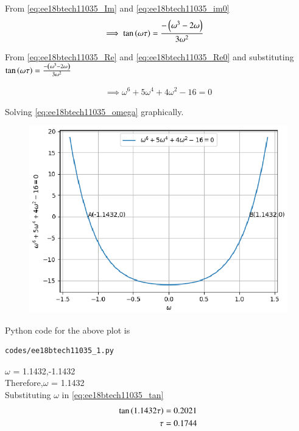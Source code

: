 \begin{enumerate}[label=\thesubsection.\arabic*.,ref=\thesubsection.\theenumi]
From \eqref{eq:ee18btech11035_Im} and \eqref{eq:ee18btech11035_im0}
\begin{align}
    \label{eq:ee18btech11035_tan}
    \implies \tan\left(\omega\tau\right)&=\frac{-\left(\omega^3-2\omega\right)}{3\omega^2}
\end{align}

From \eqref{eq:ee18btech11035_Re} and \eqref{eq:ee18btech11035_Re0} and substituting $\tan\left(\omega\tau\right)=\frac{-\left(\omega^3-2\omega\right)}{3\omega^2}$


\begin{align}
    \label{eq:ee18btech11035_omega}
    \implies  \omega^6+5\omega^4+4\omega^2-16=0
\end{align}

Solving \eqref{eq:ee18btech11035_omega} graphically.\\

\begin{figure}[!h]
  \includegraphics[width=\columnwidth]{./figs/ee18btech11035_1.eps}
  \caption{}
  \label{fig:ee18btech11035_1}
\end{figure}
Python code for the above plot is
\begin{lstlisting}
codes/ee18btech11035_1.py
\end{lstlisting}

$\omega$ = 1.1432,-1.1432 \\
Therefore,$\omega$ = 1.1432\\

Substituting $\omega$ in \eqref{eq:ee18btech11035_tan}\\
\begin{align}
    \tan\left(1.1432\tau\right)&=0.2021\\
    \tau&=0.1744
\end{align}


\end{enumerate}
